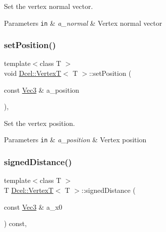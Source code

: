 Set the vertex normal vector. 


\begin{DoxyParams}[1]{Parameters}
\mbox{\tt in}  & {\em a\+\_\+normal} & Vertex normal vector \\
\hline
\end{DoxyParams}
\mbox{\label{classDcel_1_1VertexT_a9c7d9a23275e5e3165eb8c6018b55a7e}} 
\subsubsection{\texorpdfstring{set\+Position()}{setPosition()}}
{\footnotesize\ttfamily template$<$class T $>$ \\
void \hyperlink{classDcel_1_1VertexT}{Dcel\+::\+VertexT}$<$ T $>$\+::set\+Position (\begin{DoxyParamCaption}\item[{const \hyperlink{classDcel_1_1VertexT_a6e073dc7426756edef5594816be6e7c7}{Vec3} \&}]{a\+\_\+position }\end{DoxyParamCaption})\hspace{0.3cm}{\ttfamily [inline]}, {\ttfamily [noexcept]}}



Set the vertex position. 


\begin{DoxyParams}[1]{Parameters}
\mbox{\tt in}  & {\em a\+\_\+position} & Vertex position \\
\hline
\end{DoxyParams}
\mbox{\label{classDcel_1_1VertexT_afce7ba8e2bbf81b158b43af2576c4dda}} 
\subsubsection{\texorpdfstring{signed\+Distance()}{signedDistance()}}
{\footnotesize\ttfamily template$<$class T $>$ \\
T \hyperlink{classDcel_1_1VertexT}{Dcel\+::\+VertexT}$<$ T $>$\+::signed\+Distance (\begin{DoxyParamCaption}\item[{const \hyperlink{classDcel_1_1VertexT_a6e073dc7426756edef5594816be6e7c7}{Vec3} \&}]{a\+\_\+x0 }\end{DoxyParamCaption}) const\hspace{0.3cm}{\ttfamily [inline]}, {\ttfamily [noexcept]}}



